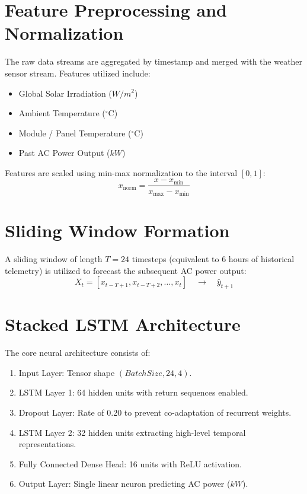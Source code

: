 \documentclass[12pt,a4paper,oneside]{report}
\begin{document}
\section{Feature Preprocessing and Normalization}
The raw data streams are aggregated by timestamp and merged with the weather sensor stream. Features utilized include:
\begin{itemize}
    \item Global Solar Irradiation ($W/m^2$)
    \item Ambient Temperature ($^\circ\text{C}$)
    \item Module / Panel Temperature ($^\circ\text{C}$)
    \item Past AC Power Output ($kW$)
\end{itemize}
Features are scaled using min-max normalization to the interval $[0, 1]$:
\begin{equation}
x_{\text{norm}} = \frac{x - x_{\text{min}}}{x_{\text{max}} - x_{\text{min}}}
\end{equation}

\section{Sliding Window Formation}
A sliding window of length $T = 24$ timesteps (equivalent to 6 hours of historical telemetry) is utilized to forecast the subsequent AC power output:
\begin{equation}
X_t = [x_{t-T+1}, x_{t-T+2}, \dots, x_t] \quad \longrightarrow \quad \hat{y}_{t+1}
\end{equation}

\section{Stacked LSTM Architecture}
The core neural architecture consists of:
\begin{enumerate}
    \item Input Layer: Tensor shape $(BatchSize, 24, 4)$.
    \item LSTM Layer 1: 64 hidden units with return sequences enabled.
    \item Dropout Layer: Rate of 0.20 to prevent co-adaptation of recurrent weights.
    \item LSTM Layer 2: 32 hidden units extracting high-level temporal representations.
    \item Fully Connected Dense Head: 16 units with ReLU activation.
    \item Output Layer: Single linear neuron predicting AC power ($kW$).
\end{enumerate}
\end{document}
